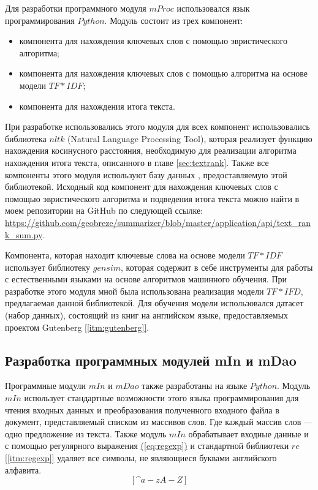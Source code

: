 Для разработки программного модуля $mProc$ использовался язык программирования $Python$. Модуль состоит из трех компонент:
\begin{itemize}
\item компонента для нахождения ключевых слов с помощью эвристического алгоритма;
\item компонента для нахождения ключевых слов с помощью алгоритма на основе модели $TF*IDF$;
\item компонента для нахождения итога текста.
\end{itemize}

При разработке использовались этого модуля для всех компонент использовались библиотека $nltk$ (Natural Language Processing Tool), которая реализует функцию нахождения косинусного расстояния, необходимую для реализации алгоритма нахождения итога текста, описанного в главе \hyperref[sec:textrank]{\ref{sec:textrank}}. Также все компоненты этого модуля используют базу данных , предоставляемую этой библиотекой.
Исходный код компонент для нахождения ключевых слов с помощью эвристического алгоритма и подведения итога текста можно найти в моем репозитории на GitHub по следующей ссылке: \url{https://github.com/geobreze/summarizer/blob/master/application/api/text_rank_sum.py}.

Компонента, которая находит ключевые слова на основе модели $TF*IDF$ использует библиотеку $gensim$, которая содержит в себе инструменты для работы с естественными языками на основе алгоритмов машинного обучения. При разработке этого модуля мной была использована реализация модели $TF*IFD$, предлагаемая данной библиотекой. Для обучения модели использовался датасет (набор данных), состоящий из книг на английском языке, предоставляемых проектом Gutenberg \hyperref[itm:gutenberg]{[\ref{itm:gutenberg}]}.

\subsection{Разработка программных модулей mIn и mDao}

Программные модули $mIn$ и $mDao$ также разработаны на языке $Python$. Модуль $mIn$ использует стандартные возможности этого языка программирования для чтения входных данных и преобразования полученного входного файла в документ, представляемый списком из массивов слов. Где каждый массив слов --- одно предложение из текста. Также модуль $mIn$ обрабатывает входные данные и с помощью регулярного выражения \hyperref[eq:regexp]{(\ref{eq:regexp})} и стандартной библиотеки $re$ \hyperref[itm:regexp]{[\ref{itm:regexp}]} удаляет все символы, не являющиеся буквами английского алфавита.
\begin{equation}
\label{eq:regexp}
[\text{\textasciicircum}a-zA-Z]
\end{equation}

